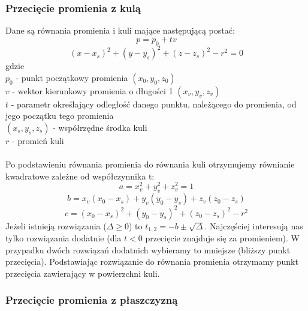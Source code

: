 \subsubsection{Przecięcie promienia z kulą}
Dane są równania promienia i kuli mające następującą postać:
$$p = p_0 + tv$$
$$(x - x_s)^2 + (y - y_s)^2 + (z - z_s)^2 - r^2 = 0$$
gdzie
\\
$p_0$ - punkt początkowy promienia $(x_0, y_0, z_0)$ \\
$v$ - wektor kierunkowy promienia o długości 1 $(x_v, y_v, z_v)$ \\
$t$ - parametr określający odległość danego punktu, należącego do promienia, od jego początku tego promienia \\
$(x_s, y_s, z_s)$ - współrzędne środka kuli \\
$r$ - promień kuli \\
\\
Po podstawieniu równania promienia do równania kuli otrzymujemy równianie kwadratowe zależne od współczynnika t:
$$a = x_v^2 + y_v^2 + z_v^2 = 1$$
$$b = x_v(x_0 - x_s) + y_v(y_0 - y_s) + z_v(z_0 - z_s)$$
$$c = (x_0 - x_s)^2 + (y_0 - y_s)^2 + (z_0 - z_s)^2 - r^2$$
Jeżeli istnieją rozwiązania ($\Delta \geq 0$) to $t_{1,2} = -b \pm \sqrt{\Delta}$. Najczęściej interesują nas tylko rozwiązania dodatnie (dla $t < 0$ przecięcie znajduje się za promieniem). W przypadku dwóch rozwiązań dodatnich wybieramy to mniejsze (bliższy punkt przecięcia). Podstawiając rozwiązanie do równania promienia otrzymamy punkt przecięcia zawierający w powierzchni kuli.

\subsubsection{Przecięcie promienia z płaszczyzną}


